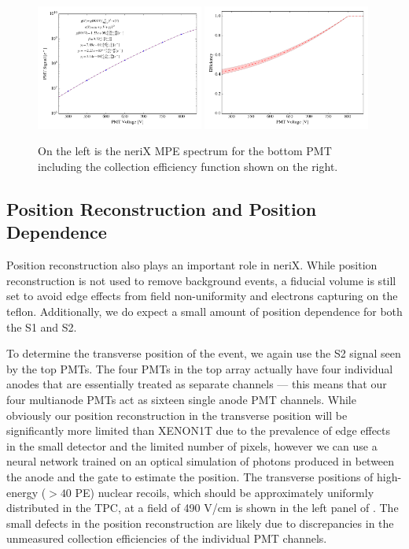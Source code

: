 \begin{figure}[t]
        \centering
	\includegraphics[width=0.49\textwidth]{nerix_mpe_spectrum}
	\includegraphics[width=0.49\textwidth]{nerix_collection_efficiency}
	\caption{On the left is the neriX MPE spectrum for the bottom PMT including the collection efficiency function shown on the right.}
	\label{fig:nerix_mpe}
\end{figure}


\subsection{Position Reconstruction and Position Dependence}

Position reconstruction also plays an important role in neriX.  While position reconstruction is not used to remove background events, a fiducial volume is still set to avoid edge effects from field non-uniformity and electrons capturing on the teflon.  Additionally, we do expect a small amount of position dependence for both the S1 and S2.  

To determine the transverse position of the event, we again use the S2 signal seen by the top PMTs.  The four PMTs in the top array actually have four individual anodes that are essentially treated as separate channels --- this means that our four multianode PMTs act as sixteen single anode PMT channels.  While obviously our position reconstruction in the transverse position will be significantly more limited than XENON1T due to the prevalence of edge effects in the small detector and the limited number of pixels, however we can use a neural network trained on an optical simulation of photons produced in between the anode and the gate to estimate the position.  The transverse positions of high-energy ($>40$ PE) nuclear recoils, which should be approximately uniformly distributed in the TPC, at a field of 490 V/cm is shown in the left panel of .  The small defects in the position reconstruction are likely due to discrepancies in the unmeasured collection efficiencies of the individual PMT channels.

